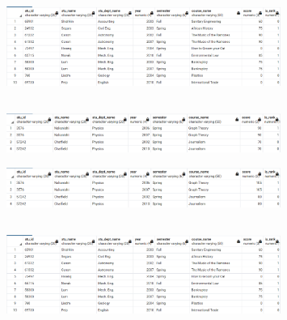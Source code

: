 \documentclass{article}
\begin{document}
\subsection{}
\begin{figure}[H]
    \centering
    \includegraphics[width=0.8\textwidth]{figures/2-b.png}
    \caption
	{
	}
    \label{fig:fig1}
\end{figure}

\subsection{}
\begin{figure}[H]
    \centering
    \includegraphics[width=0.8\textwidth]{figures/2-c-before.png}
    \caption
	{
	}
    \label{fig:fig1}
\end{figure}
\begin{figure}[H]
    \centering
    \includegraphics[width=0.8\textwidth]{figures/2-c-after.png}
    \caption
	{
	}
    \label{fig:fig1}
\end{figure}

\subsection{}
\begin{figure}[H]
    \centering
    \includegraphics[width=0.8\textwidth]{figures/2-b.png}
    \caption
	{
	}
    \label{fig:fig1}
\end{figure}
\end{document}
